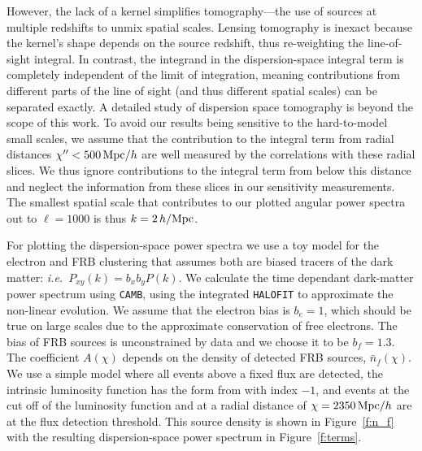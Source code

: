 \documentclass[twocolumn,prl,floatfix]{revtex4-1}
\begin{document}
However, the lack of a kernel simplifies tomography---the use of sources at
multiple redshifts to unmix spatial scales.
Lensing tomography is inexact because the kernel's shape depends on
the source redshift, thus re-weighting the line-of-sight integral.
In contrast, the integrand in the dispersion-space integral
term is completely independent of the limit of integration, meaning
contributions from different parts of the line of sight (and thus different
spatial scales) can be separated exactly. A detailed study of dispersion space
tomography is beyond the scope of this work.  To avoid our results being
sensitive to the hard-to-model small scales, we assume that the contribution to the
integral term from radial distances $\chi'' < 500\,{\rm Mpc}/h$ are well
measured by the correlations with these radial slices. We thus ignore
contributions to the integral term from below this distance and neglect the
information from these slices in our sensitivity measurements. The smallest
spatial scale that contributes to our plotted angular power spectra out to
$\ell=1000$ is thus $k=2\,h/{\rm Mpc}$.

For plotting the dispersion-space power spectra we use a toy model for the electron and
FRB clustering that assumes both are biased tracers of the dark matter:
\emph{i.e.}~$P_{xy}(k)=b_x b_y P(k)$.  We
calculate the time dependant dark-matter power spectrum using {\tt CAMB}, using
the integrated {\tt HALOFIT} to approximate the non-linear evolution. We assume
that the electron bias is $b_e=1$, which should be true on large scales due to
the approximate conservation of free electrons. The bias of FRB sources is
unconstrained by data and we choose it to be $b_f=1.3$. The coefficient
$A(\chi)$ depends on the density of detected FRB sources, $\bar n_f(\chi)$.
We use a simple model where all events above a fixed flux are detected,
the intrinsic luminosity function has the form from
\citet{1976ApJ...203..297S} with index $-1$, and events at the cut off of the
luminosity function and at
a radial distance of $\chi=2350\,{\rm Mpc}/h$ are at the flux detection threshold.
This source density is shown in Figure~\ref{f:n_f} with the resulting dispersion-space
power spectrum in Figure~\ref{f:terms}.
\end{document}
